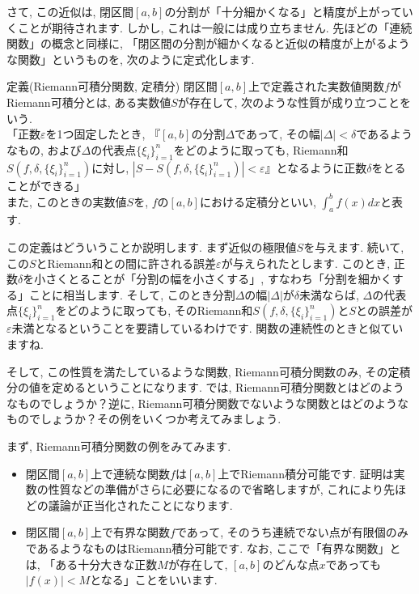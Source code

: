 \par さて, この近似は, 閉区間$[a,b]$の分割が「十分細かくなる」と精度が上がっていくことが期待されます. しかし, これは一般には成り立ちません. 先ほどの「連続関数」の概念と同様に, 「閉区間の分割が細かくなると近似の精度が上がるような関数」というものを, 次のように定式化します. 
\begin{itembox}[l]{定義(Riemann可積分関数, 定積分)}
閉区間$[a,b]$上で定義された実数値関数$f$がRiemann可積分とは, ある実数値$S$が存在して, 次のような性質が成り立つことをいう. \\
「正数$\varepsilon$を1つ固定したとき, 『$[a,b]$の分割$\Delta$であって, その幅$\left|\Delta\right|<\delta$であるようなもの, および$\Delta$の代表点$\{\xi _i\}_{i=1}^{n}$をどのように取っても, Riemann和$S\left(f,\delta,\{\xi _i\}_{i=1}^{n}\right)$に対し, $\left|S-S\left(f,\delta,\{\xi _i\}_{i=1}^{n}\right)\right|<\varepsilon$』となるように正数$\delta$をとることができる」 \\
また, このときの実数値$S$を, $f$の$[a,b]$における定積分といい, $\displaystyle \int_a^b f(x) dx$と表す. 
\end{itembox}
\par この定義はどういうことか説明します. まず近似の極限値$S$を与えます. 続いて, この$S$とRiemann和との間に許される誤差$\varepsilon$が与えられたとします. このとき, 正数$\delta$を小さくとることが「分割の幅を小さくする」, すなわち「分割を細かくする」ことに相当します. そして, このとき分割$\Delta$の幅$\left|\Delta\right|$が$\delta$未満ならば, $\Delta$の代表点$\{\xi _i\}_{i=1}^{n}$をどのように取っても, そのRiemann和$S\left(f,\delta,\{\xi _i\}_{i=1}^{n}\right)$と$S$との誤差が$\varepsilon$未満となるということを要請しているわけです. 関数の連続性のときと似ていますね. 
\par そして, この性質を満たしているような関数, Riemann可積分関数のみ, その定積分の値を定めるということになります. では, Riemann可積分関数とはどのようなものでしょうか？逆に, Riemann可積分関数でないような関数とはどのようなものでしょうか？その例をいくつか考えてみましょう. 
\par まず, Riemann可積分関数の例をみてみます. 
\begin{itemize}
\item 閉区間$[a,b]$上で連続な関数$f$は$[a,b]$上でRiemann積分可能です. 証明は実数の性質などの準備がさらに必要になるので省略しますが, これにより先ほどの議論が正当化されたことになります.  
\item 閉区間$[a,b]$上で有界な関数$f$であって, そのうち連続でない点が有限個のみであるようなものはRiemann積分可能です. なお, ここで「有界な関数」とは, 「ある十分大きな正数$M$が存在して, $[a,b]$のどんな点$x$であっても$\left|f(x)\right|<M$となる」ことをいいます. 
\end{itemize}

